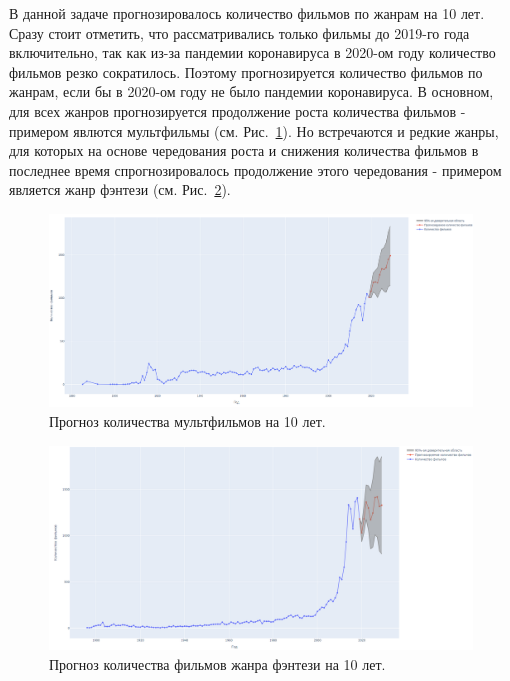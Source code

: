 В данной задаче прогнозировалось количество фильмов по жанрам на 10 лет. Сразу стоит отметить, что рассматривались только фильмы до 2019-го года включительно, так как из-за пандемии коронавируса в 2020-ом году количество фильмов резко сократилось. Поэтому прогнозируется количество фильмов по жанрам, если бы в 2020-ом году не было пандемии коронавируса. В основном, для всех жанров прогнозируется продолжение роста количества фильмов - примером явлются мультфильмы (см. Рис.~\ref{fig:cartoons}). Но встречаются и редкие жанры, для которых на основе чередования роста и снижения количества фильмов в последнее время спрогнозировалось продолжение этого чередования - примером является жанр фэнтези (см. Рис.~\ref{fig:fantasy}).

\begin{figure}[ht!]
	\includegraphics[width=\linewidth]{../report/images/genre_predict/cartoons}
	\caption{Прогноз количества мультфильмов на 10 лет.}
	\label{fig:cartoons}
\end{figure}

\begin{figure}[ht!]
	\includegraphics[width=\linewidth]{../report/images/genre_predict/fantasy}
	\caption{Прогноз количества фильмов жанра фэнтези на 10 лет.}
	\label{fig:fantasy}
\end{figure}




